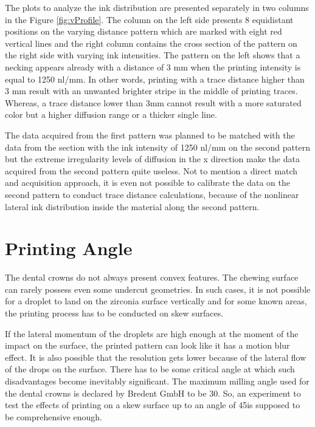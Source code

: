 \bigskip

The plots to analyze the ink distribution are presented separately in two columns in the Figure \ref{fig:vProfile}. The column on the left side presents 8 equidistant positions on the varying distance pattern which are marked with eight red vertical lines and the right column contains the cross section of the pattern on the right side with varying ink intensities. The pattern on the left shows that a necking appears already with a distance of 3 mm when the printing intensity is equal to 1250 nl/mm. In other words, printing with a trace distance higher than 3 mm result with an unwanted brighter stripe in the middle of printing traces. Whereas, a trace distance lower than 3mm cannot result with a more saturated color but a higher diffusion range or a thicker single line. 

The data acquired from the first pattern was planned to be matched with the data from the section with the ink intensity of 1250 nl/mm on the second pattern but the extreme irregularity levels of diffusion in the x direction make the data acquired from the second pattern quite useless. Not to mention a direct match and acquisition approach, it is even not possible to calibrate the data on the second pattern to conduct trace distance calculations, because of the nonlinear lateral ink distribution inside the material along the second pattern. 



\section{Printing Angle}
The dental crowns do not always present convex features. The chewing surface can rarely possess even some undercut geometries. In such cases, it is not possible for a droplet to land on the zirconia surface vertically and for some known areas, the printing process has to be conducted on skew surfaces. 

If the lateral momentum of the droplets are high enough at the moment of the impact on the surface, the printed pattern can look like it has a motion blur effect. It is also possible that the resolution gets lower because of the lateral flow of the drops on the surface. There has to be some critical angle at which such disadvantages become inevitably  significant. The maximum milling angle used for the dental crowns is declared by Bredent GmbH to be 30\textdegree \space. So, an experiment to test the effects of printing on a skew surface up to an angle of 45\textdegree \space is supposed to be comprehensive enough.

